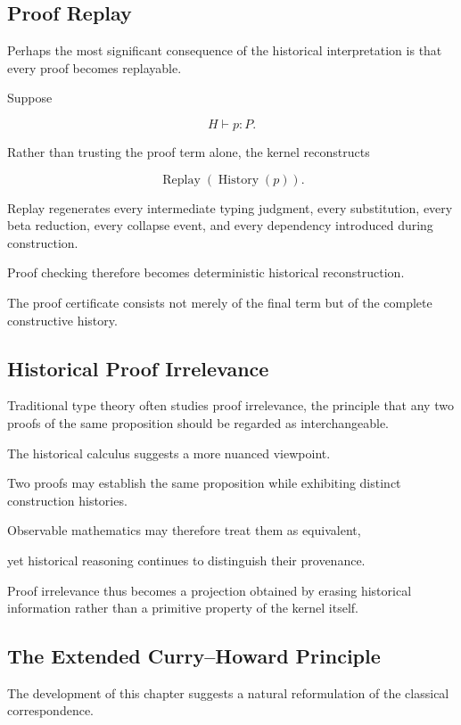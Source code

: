 \documentclass[12pt,oneside]{article}
\theoremstyle{definition}
\theoremstyle{remark}
\DeclareMathOperator{\History}{History}
\DeclareMathOperator{\Replay}{Replay}
\begin{document}
\subsection{Proof Replay}

Perhaps the most significant consequence of the historical interpretation is
that every proof becomes replayable.

Suppose

\[
H
\vdash
p
:
P.
\]

Rather than trusting the proof term alone, the kernel reconstructs

\[
\Replay(\History(p)).
\]

Replay regenerates every intermediate typing judgment, every substitution, every
beta reduction, every collapse event, and every dependency introduced during
construction.

Proof checking therefore becomes deterministic historical reconstruction.

The proof certificate consists not merely of the final term but of the complete
constructive history.

\subsection{Historical Proof Irrelevance}

Traditional type theory often studies proof irrelevance, the principle that any
two proofs of the same proposition should be regarded as interchangeable.

The historical calculus suggests a more nuanced viewpoint.

Two proofs may establish the same proposition while exhibiting distinct
construction histories.

Observable mathematics may therefore treat them as equivalent,

yet historical reasoning continues to distinguish their provenance.

Proof irrelevance thus becomes a projection obtained by erasing historical
information rather than a primitive property of the kernel itself.

\subsection{The Extended Curry--Howard Principle}

The development of this chapter suggests a natural reformulation of the classical
correspondence.
\end{document}
